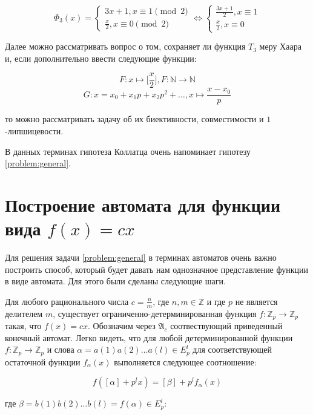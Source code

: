 \documentclass[och, master]{SCWorks}
\theoremstyle{plain}
\theoremstyle{plain}
\theoremstyle{plain}
\theoremstyle{definition}
\begin{document}
\begin{equation} \label{problem:2}
\Phi_3(x)= \begin{cases}
   3x+1, x \equiv 1 \pmod 2
   \\
   \frac{x}{2}, x \equiv 0 \pmod 2
 \end{cases} \Leftrightarrow
\begin{cases}
   \frac{3x+1}{2}, x \equiv 1
   \\
   \frac{x}{2}, x \equiv 0
    \end{cases}
\end{equation}
 
\noindent Далее можно рассматривать вопрос о том, сохраняет ли функция $T_3$ меру Хаара и, если дополнительно ввести следующие функции:

$$ F: x \longmapsto \bigg[\frac{x}{2}\bigg], F: \mathbb N \rightarrow \mathbb N $$
$$ G: x=x_0+x_1p+x_2p^2+\ldots, x \longmapsto \frac{x-x_0}{p}$$

\noindent то можно рассматривать задачу об их биективности, совместимости и $1$-липшицевости.

В данных терминах гипотеза Коллатца очень напоминает гипотезу \ref{problem:general}.


\section{Построение автомата для функции вида $f(x)=cx$}

Для решения задачи \ref{problem:general} в терминах автоматов очень важно построить способ, который будет давать нам однозначное представление функции в виде автомата. Для этого были сделаны следующие шаги.


Для любого рационального числа $c=\frac{n}{m}$, где $n,m \in \mathbb Z$ и где $p$ не является делителем $m$, существует ограниченно-детерминированная функция $f: \mathbb Z_p \rightarrow \mathbb Z_p$ такая, что $f(x)=cx$. Обозначим через $\mathfrak{A}_c$ соотвествующий приведенный конечный автомат. Легко видеть, что для любой детерминированной функции $f: \mathbb Z_p \rightarrow \mathbb Z_p$ и слова $\alpha=a(1)a(2)\ldots a(l) \in E^l_p$ для соответствующей остаточной функции $f_\alpha (x)$ выполняется следующее соотношение:

\begin{equation} \label{automata:2}
f([\alpha]+p^lx)=[\beta]+p^l f_{\alpha}(x)
\end{equation}

\noindent где $\beta=b(1)b(2)\ldots b(l) =f(\alpha) \in E^l_p$:
\end{document}

